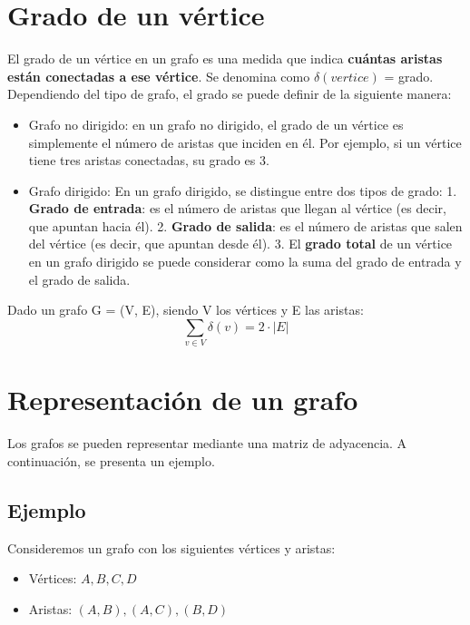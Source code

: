 \documentclass{article}
\begin{document}
\newpage

\section{Grado de un vértice}
El grado de un vértice en un grafo es una medida que indica \textbf{cuántas aristas están conectadas a ese vértice}. Se denomina como $\delta(vertice)$ = grado.
Dependiendo del tipo de grafo, el grado se puede definir de la siguiente manera:

\begin{itemize}
    \item Grafo no dirigido: en un grafo no dirigido, el grado de un vértice es simplemente el número de aristas que inciden en él. Por ejemplo, si un vértice tiene tres aristas conectadas, su grado es 3.

    \item Grafo dirigido: En un grafo dirigido, se distingue entre dos tipos de grado:
        1. \textbf{Grado de entrada}: es el número de aristas que llegan al vértice (es decir, que apuntan hacia él).
        2. \textbf{Grado de salida}: es el número de aristas que salen del vértice (es decir, que apuntan desde él).
        3. El \textbf{grado total} de un vértice en un grafo dirigido se puede considerar como la suma del grado de entrada y el grado de salida.
\end{itemize}

Dado un grafo G = (V, E), siendo V los vértices y E las aristas: 
$$\sum_{v \in V} \delta(v) = 2 \cdot |E|$$

\section{Representación de un grafo}

Los grafos se pueden representar mediante una matriz de adyacencia. A continuación, se presenta un ejemplo.

\subsection*{Ejemplo}

Consideremos un grafo con los siguientes vértices y aristas:

\begin{itemize}
    \item Vértices: $ A, B, C, D $
    \item Aristas: $ (A, B), (A, C), (B, D) $
\end{itemize}
\end{document}
